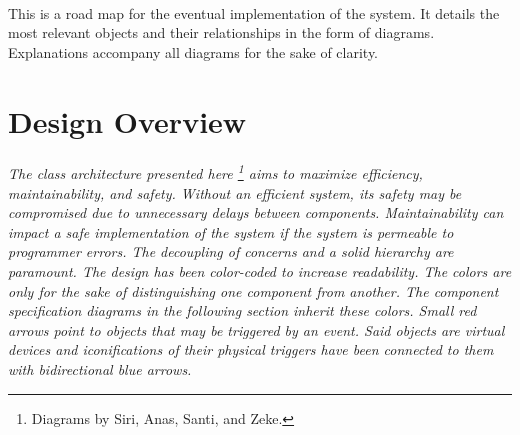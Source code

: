 \documentclass[12pt]{article}
\begin{document}
\paragraph{} This is a road map for the eventual implementation of the system. It details the most relevant objects and their relationships in the form of diagrams. Explanations accompany all diagrams for the sake of clarity.

\section{Design Overview} \label{over}
\paragraph{} \textit{The class architecture presented here \footnote{Diagrams by 
Siri, Anas, Santi, and Zeke.} aims to maximize efficiency, maintainability, and 
safety. Without an efficient system, its safety may be compromised due to unnecessary 
delays between components. Maintainability can impact a safe implementation of the 
system if the system is permeable to programmer errors. The decoupling of concerns and 
a solid hierarchy are paramount. The design has been color-coded to increase readability. 
The colors are only for the sake of distinguishing one component from another. The component 
specification diagrams in the following section inherit these colors. Small red arrows point 
to objects that may be triggered by an event. Said objects are virtual devices and iconifications 
of their physical triggers have been connected to them with bidirectional blue arrows.}

%      
 
%
%
\end{document}
